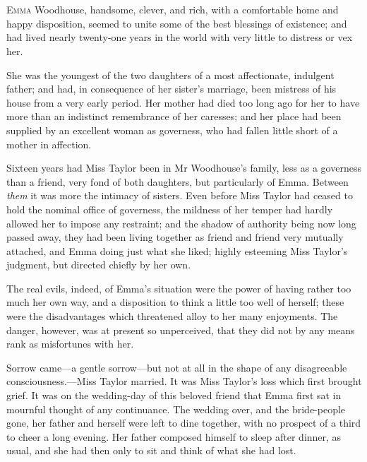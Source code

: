 \chapter[Chapter \thechapter]{}
	
\lettrine[lines=4,lraise=0.3]{E}{mma} Woodhouse, handsome, clever, and rich, with a comfortable home and happy disposition, seemed to unite some of the best blessings of existence; and had lived nearly twenty-one years in the world with very little to distress or vex her.

She was the youngest of the two daughters of a most affectionate, indulgent father; and had, in consequence of her sister's marriage, been mistress of his house from a very early period. Her mother had died too long ago for her to have more than an indistinct remembrance of her caresses; and her place had been supplied by an excellent woman as governess, who had fallen little short of a mother in affection.

Sixteen years had Miss Taylor been in Mr Woodhouse's family, less as a governess than a friend, very fond of both daughters, but particularly of Emma. Between \textit{them} it was more the intimacy of sisters. Even before Miss Taylor had ceased to hold the nominal office of governess, the mildness of her temper had hardly allowed her to impose any restraint; and the shadow of authority being now long passed away, they had been living together as friend and friend very mutually attached, and Emma doing just what she liked; highly esteeming Miss Taylor's judgment, but directed chiefly by her own.

The real evils, indeed, of Emma's situation were the power of having rather too much her own way, and a disposition to think a little too well of herself; these were the disadvantages which threatened alloy to her many enjoyments. The danger, however, was at present so unperceived, that they did not by any means rank as misfortunes with her.

Sorrow came—a gentle sorrow—but not at all in the shape of any disagreeable consciousness.—Miss Taylor married. It was Miss Taylor's loss which first brought grief. It was on the wedding-day of this beloved friend that Emma first sat in mournful thought of any continuance. The wedding over, and the bride-people gone, her father and herself were left to dine together, with no prospect of a third to cheer a long evening. Her father composed himself to sleep after dinner, as usual, and she had then only to sit and think of what she had lost.


